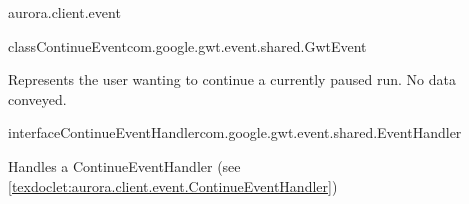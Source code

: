 \begin{texdocpackage}{aurora.client.event}
\begin{texdocclass}{class}{ContinueEvent}{com.google.gwt.event.shared.GwtEvent}{}
\label{texdoclet:aurora.client.event.ContinueEvent}
\begin{texdocclassintro}
Represents the user wanting to continue a currently paused run.
 No data conveyed.\end{texdocclassintro}
\begin{texdocclassfields}
\end{texdocclassfields}
\begin{texdocclassconstructors}
\end{texdocclassconstructors}
\begin{texdocclassmethods}
\end{texdocclassmethods}
\end{texdocclass}


\begin{texdocclass}{interface}{ContinueEventHandler}{}{com.google.gwt.event.shared.EventHandler}
\label{texdoclet:aurora.client.event.ContinueEventHandler}
\begin{texdocclassintro}
Handles a ContinueEventHandler (see \ref{texdoclet:aurora.client.event.ContinueEventHandler})\end{texdocclassintro}
\begin{texdocclassmethods}
\end{texdocclassmethods}
\end{texdocclass}



\end{texdocpackage}
